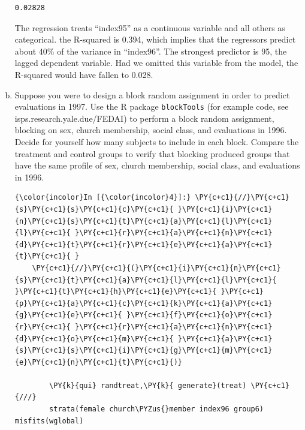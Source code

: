 \documentclass[11pt,notitlepage]{article}\usepackage[]{graphicx}\usepackage[]{color}
\makeatletter
\newenvironment{kframe}{%
 \def\at@end@of@kframe{}%
 \ifinner\ifhmode%
  \def\at@end@of@kframe{\end{minipage}}%
  \begin{minipage}{\columnwidth}%
 \fi\fi%
 \def\FrameCommand##1{\hskip\@totalleftmargin \hskip-\fboxsep
 \colorbox{shadecolor}{##1}\hskip-\fboxsep
     \hskip-\linewidth \hskip-\@totalleftmargin \hskip\columnwidth}%
 \MakeFramed {\advance\hsize-\width
   \@totalleftmargin\z@ \linewidth\hsize
   \@setminipage}}%
 {\par\unskip\endMakeFramed%
 \at@end@of@kframe}
\newenvironment{knitrout}{}{} %
\makeatother
\begin{document}
\begin{enumerate}[a)]
\begin{knitrout}
\begin{kframe}
    \begin{Verbatim}[commandchars=\\\{\}]
 0.02828
    \end{Verbatim}
\end{kframe}
\end{knitrout}

The regression treats ``index95'' as a continuous variable and all others as categorical.  the R-squared is 0.394, which implies that the regressors predict about 40\% of the variance in ``index96''.  The strongest predictor is 95, the lagged dependent variable.  Had we omitted this variable from the model, the R-squared would have fallen to 0.028.

\item Suppose you were to design a block random assignment in order to predict evaluations in 1997. Use the R package \texttt{blockTools} (for example code, see isps.research.yale.due/FEDAI) to perform a block random assignment, blocking on sex, church membership, social class, and evaluations in 1996. Decide for yourself how many subjects to include in each block. Compare the treatment and control groups to verify that blocking produced groups that have the same profile of sex, church membership, social class, and evaluations in 1996.

\begin{knitrout}
\color{fgcolor}\begin{kframe}
    \begin{Verbatim}[commandchars=\\\{\}]
{\color{incolor}In [{\color{incolor}4}]:} \PY{c+c1}{//}\PY{c+c1}{s}\PY{c+c1}{s}\PY{c+c1}{c}\PY{c+c1}{ }\PY{c+c1}{i}\PY{c+c1}{n}\PY{c+c1}{s}\PY{c+c1}{t}\PY{c+c1}{a}\PY{c+c1}{l}\PY{c+c1}{l}\PY{c+c1}{ }\PY{c+c1}{r}\PY{c+c1}{a}\PY{c+c1}{n}\PY{c+c1}{d}\PY{c+c1}{t}\PY{c+c1}{r}\PY{c+c1}{e}\PY{c+c1}{a}\PY{c+c1}{t}\PY{c+c1}{ }
	\PY{c+c1}{//}\PY{c+c1}{(}\PY{c+c1}{i}\PY{c+c1}{n}\PY{c+c1}{s}\PY{c+c1}{t}\PY{c+c1}{a}\PY{c+c1}{l}\PY{c+c1}{l}\PY{c+c1}{ }\PY{c+c1}{t}\PY{c+c1}{h}\PY{c+c1}{e}\PY{c+c1}{ }\PY{c+c1}{p}\PY{c+c1}{a}\PY{c+c1}{c}\PY{c+c1}{k}\PY{c+c1}{a}\PY{c+c1}{g}\PY{c+c1}{e}\PY{c+c1}{ }\PY{c+c1}{f}\PY{c+c1}{o}\PY{c+c1}{r}\PY{c+c1}{ }\PY{c+c1}{r}\PY{c+c1}{a}\PY{c+c1}{n}\PY{c+c1}{d}\PY{c+c1}{o}\PY{c+c1}{m}\PY{c+c1}{ }\PY{c+c1}{a}\PY{c+c1}{s}\PY{c+c1}{s}\PY{c+c1}{i}\PY{c+c1}{g}\PY{c+c1}{m}\PY{c+c1}{e}\PY{c+c1}{n}\PY{c+c1}{t}\PY{c+c1}{)}

        \PY{k}{qui} randtreat,\PY{k}{ generate}(treat) \PY{c+c1}{///}
        strata(female church\PYZus{}member index96 group6) misfits(wglobal)
\end{Verbatim}


\end{kframe}
\end{knitrout}
\end{enumerate}
\end{document}
